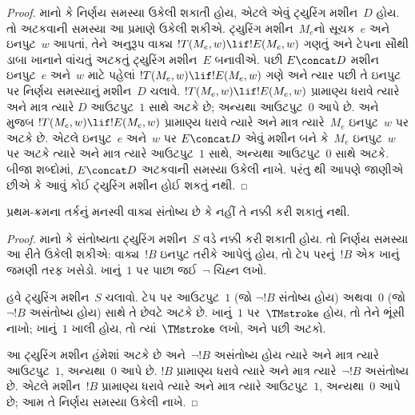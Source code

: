 \begin{proof}
માનો કે નિર્ણય સમસ્યા ઉકેલી શકાતી હોય, એટલે એવું
ટ્યુરિંગ મશીન~$D$ હોય. તો અટકવાની સમસ્યા આ પ્રમાણે
ઉકેલી શકીએ. ટ્યુરિંગ મશીન~$M_e$નો સૂચક~$e$ અને
ઇનપુટ~$w$ આપતાં, તેને અનુરૂપ વાક્ય
$!T(M_e, w) \lif !E(M_e, w)$ ગણતું અને ટેપના સૌથી
ડાબા ખાનાને વાંચતું અટકતું ટ્યુરિંગ મશીન~$E$ બનાવીએ.
પછી $E \concat D$ મશીન ઇનપુટ~$e$ અને~$w$ માટે
પહેલાં $!T(M_e, w) \lif !E(M_e, w)$ ગણે અને ત્યાર પછી
તે ઇનપુટ પર નિર્ણય સમસ્યાનું મશીન~$D$ ચલાવે.
$!T(M_e, w) \lif !E(M_e, w)$ પ્રામાણ્ય ધરાવે ત્યારે
અને માત્ર ત્યારે $D$ આઉટપુટ~$1$ સાથે અટકે છે;
અન્યથા આઉટપુટ~$0$ આપે છે.
 અને
 મુજબ
$!T(M_e, w) \lif !E(M_e, w)$ પ્રામાણ્ય
ધરાવે ત્યારે અને માત્ર ત્યારે~$M_e$ ઇનપુટ~$w$ પર
અટકે છે. એટલે ઇનપુટ~$e$ અને~$w$ પર $E\concat D$
એવું મશીન બને કે~$M_e$ ઇનપુટ~$w$ પર અટકે ત્યારે
અને માત્ર ત્યારે આઉટપુટ~$1$ સાથે, અન્યથા આઉટપુટ~$0$
સાથે અટકે. બીજા શબ્દોમાં, $E \concat D$ અટકવાની
સમસ્યા ઉકેલી નાખે. પરંતુ
થી આપણે જાણીએ છીએ
કે આવું કોઈ ટ્યુરિંગ મશીન હોઈ શકતું નથી.
\end{proof}

\begin{cor}%
પ્રથમ-ક્રમના તર્કનું મનસ્વી વાક્ય સંતોષ્ય છે કે
નહીં તે નક્કી કરી શકાતું નથી.
\end{cor}

\begin{proof}
  માનો કે સંતોષ્યતા ટ્યુરિંગ મશીન~$S$ વડે નક્કી કરી
  શકાતી હોય. તો નિર્ણય સમસ્યા આ રીતે ઉકેલી શકીએ:
  વાક્ય~$!B$ ઇનપુટ તરીકે આપેલું હોય, તો
  ટેપ પરનું~$!B$ એક ખાનું જમણી તરફ ખસેડો.
  ખાનું~$1$ પર પાછા જઈ~$\lnot$ ચિહ્ન લખો.

  હવે ટ્યુરિંગ મશીન~$S$ ચલાવો. ટેપ પર આઉટપુટ~$1$
  (જો $\lnot !B$ સંતોષ્ય હોય) અથવા~$0$ (જો
  $\lnot !B$ અસંતોષ્ય હોય) સાથે તે છેવટે અટકે છે.
  ખાનું~$1$ પર~$\TMstroke$ હોય, તો તેને ભૂંસી નાખો;
  ખાનું~$1$ ખાલી હોય, તો ત્યાં~$\TMstroke$ લખો,
  અને પછી અટકો.

  આ ટ્યુરિંગ મશીન હંમેશાં અટકે છે અને~$\lnot !B$
  અસંતોષ્ય હોય ત્યારે અને માત્ર ત્યારે આઉટપુટ~$1$,
  અન્યથા~$0$ આપે છે. $!B$ પ્રામાણ્ય ધરાવે ત્યારે
  અને માત્ર ત્યારે~$\lnot !B$ અસંતોષ્ય છે. એટલે
  મશીન~$!B$ પ્રામાણ્ય ધરાવે ત્યારે અને માત્ર ત્યારે
  આઉટપુટ~$1$, અન્યથા~$0$ આપે છે; આમ તે નિર્ણય
  સમસ્યા ઉકેલી નાખે.
\end{proof}

